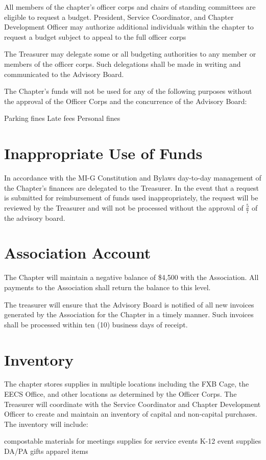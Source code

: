 \documentclass[bylaws,final,10pt,withoutoptional,withoutpreface,officerdoc]{../bylaws}
\begin{document}
All members of the chapter’s officer corps and chairs of standing committees are eligible to request a budget. President, Service Coordinator, and Chapter Development Officer may authorize additional individuals within the chapter to request a budget subject to appeal to the full officer corps
\hfil \break

The Treasurer may delegate some or all budgeting authorities to any member or members of the officer corps. Such delegations shall be made in writing and communicated to the Advisory Board.
 \hfil \break
 

The Chapter's funds will not be used for any of the following purposes without the approval of the Officer Corps and the concurrence of the Advisory Board:
\begin{enumsubsection}
\itemnotoc Parking fines
\itemnotoc Late fees
\itemnotoc Personal fines
\end{enumsubsection}

\hfil \break

\section{Inappropriate Use of Funds}
In accordance with the MI-G Constitution and Bylaws day-to-day management of the Chapter's finances are delegated to the Treasurer. In the event that a request is submitted for reimbursement of funds used inappropriately, the request will be reviewed by the Treasurer and will not be processed without the approval of $\frac{5}{7}$ of the advisory board.
\hfil\break


\section{Association Account}
The Chapter will maintain a negative balance of \$4,500 with the Association. All payments to the Association shall return the balance to this level.
\hfil \break

The treasurer will ensure that the Advisory Board is notified of all new invoices generated by the Association for the Chapter in a timely manner. Such invoices shall be processed within ten (10) business days of receipt.


\section{Inventory}
The chapter stores supplies in multiple locations including the FXB Cage, the EECS Office, and other locations as determined by the Officer Corps. The Treasurer will coordinate with the Service Coordinator and Chapter Development Officer to create and maintain an inventory of capital and non-capital purchases. The inventory will include:
\begin{enumsubsection}
\itemnotoc compostable materials for meetings
\itemnotoc supplies for service events
\itemnotoc K-12 event supplies
\itemnotoc DA/PA gifts
\itemnotoc apparel items
\end{enumsubsection}
\end{document}
